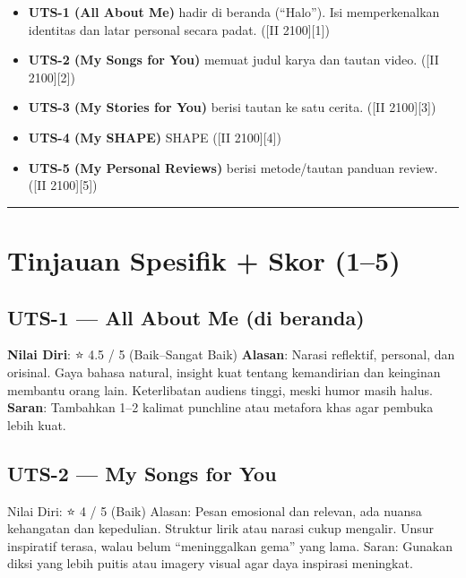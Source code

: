 \documentclass[
  letterpaper,
  DIV=11,
  numbers=noendperiod]{scrreprt}
\providecommand{\tightlist}{%
  \setlength{\itemsep}{0pt}\setlength{\parskip}{0pt}}\usepackage{longtable,booktabs,array}
\begin{document}
\begin{itemize}
\tightlist
\item
  \textbf{UTS-1 (All About Me)} hadir di beranda (``Halo''). Isi
  memperkenalkan identitas dan latar personal secara padat. ({[}II
  2100{]}{[}1{]})
\item
  \textbf{UTS-2 (My Songs for You)} memuat judul karya dan tautan video.
  ({[}II 2100{]}{[}2{]})
\item
  \textbf{UTS-3 (My Stories for You)} berisi tautan ke satu cerita.
  ({[}II 2100{]}{[}3{]})
\item
  \textbf{UTS-4 (My SHAPE)} SHAPE ({[}II 2100{]}{[}4{]})
\item
  \textbf{UTS-5 (My Personal Reviews)} berisi metode/tautan panduan
  review. ({[}II 2100{]}{[}5{]})
\end{itemize}

\begin{center}\rule{0.5\linewidth}{0.5pt}\end{center}

\section{Tinjauan Spesifik + Skor
(1--5)}\label{tinjauan-spesifik-skor-15}

\subsection{UTS-1 --- All About Me (di
beranda)}\label{uts-1-all-about-me-di-beranda}

\textbf{Nilai Diri}: ⭐ 4.5 / 5 (Baik--Sangat Baik) \textbf{Alasan}:
Narasi reflektif, personal, dan orisinal. Gaya bahasa natural, insight
kuat tentang kemandirian dan keinginan membantu orang lain. Keterlibatan
audiens tinggi, meski humor masih halus. \textbf{Saran}: Tambahkan 1--2
kalimat punchline atau metafora khas agar pembuka lebih kuat.

\subsection{UTS-2 --- My Songs for You}\label{uts-2-my-songs-for-you-1}

Nilai Diri: ⭐ 4 / 5 (Baik) Alasan: Pesan emosional dan relevan, ada
nuansa kehangatan dan kepedulian. Struktur lirik atau narasi cukup
mengalir. Unsur inspiratif terasa, walau belum ``meninggalkan gema''
yang lama. Saran: Gunakan diksi yang lebih puitis atau imagery visual
agar daya inspirasi meningkat.
\end{document}
